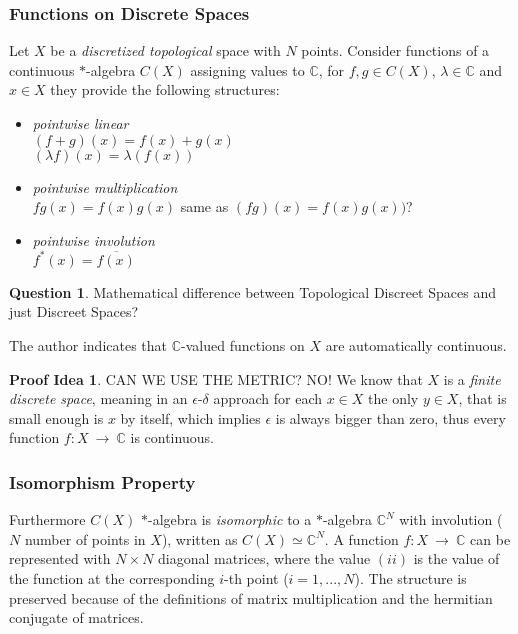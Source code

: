 \documentclass[a4paper]{article}
\theoremstyle{definition}
\theoremstyle{definition}
\newtheorem{question}{Question}
\theoremstyle{theorem}
\theoremstyle{theorem}
\theoremstyle{definition}
\newtheorem*{idea}{Proof Idea}
\begin{document}
\subsubsection{Functions on Discrete Spaces}
Let $X$ be a \textit{discretized topological} space with $N$ points.
Consider functions of a continuous $*$-algebra $C(X)$ assigning values to $\mathbb{C}$, for $f, g \in C(X)$,
$\lambda \in \mathbb{C}$ and $x \in X$ they provide the following structures:

\begin{itemize}
    \item \textit{pointwise linear} \\
      $(f + g)(x) = f(x) + g(x)$\\
      $(\lambda f)(x) = \lambda (f(x))$
    \item \textit{pointwise multiplication} \\
        $fg(x) = f(x)g(x)$ \hspace{0.1\textwidth} same as $(fg)(x) = f(x)g(x))$?
    \item \textit{pointwise involution} \\
        $f^*(x) = \overline{f(x)}$
\end{itemize}

\begin{question}
    Mathematical difference between Topological Discreet Spaces and just Discreet Spaces?
\end{question}

The author indicates that $\mathbb{C}$-valued functions on $X$ are automatically continuous.
\begin{idea}
    CAN WE USE THE METRIC? NO!
    We know that $X$ is a \textit{finite discrete space}, meaning in an $\epsilon$-$\delta$ approach
    for each $x \in X$ the only $y \in X$, that is small enough is $x$ by itself, which implies
    $\epsilon$ is always bigger than zero, thus every function $f:X\ \rightarrow\ \mathbb{C}$ is continuous.
\end{idea}

\subsubsection{Isomorphism Property}
Furthermore $C(X)$ $*$-algebra is \textit{isomorphic} to a $*$-algebra $\mathbb{C}^N$ with involution
($N$ number of points in $X$), written as $C(X) \simeq \mathbb{C}^N$.
A function $f:X\ \rightarrow\ \mathbb{C}$ can be represented with $N \times N$ diagonal matrices,
where the value $(ii)$ is the value of the function at the corresponding
$i$-th point ($i = 1,...,N$). The structure is preserved because of the definitions of
matrix multiplication and the hermitian conjugate of matrices.
\end{document}
